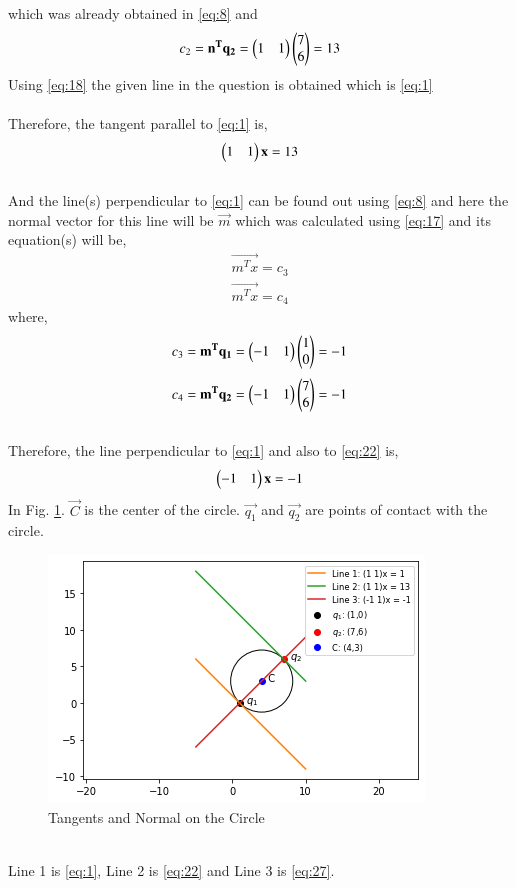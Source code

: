 \documentclass[journal,12pt,twocolumn]{IEEEtran}
\begin{document}
which was already obtained in \eqref{eq:8} and\\
\begin{align}
c_2 = \mathbf{n^Tq_2} = \begin{pmatrix}1 & 1\end{pmatrix}\begin{pmatrix}7 \\ 6\end{pmatrix} = 13 \label{eq:21}
\end{align}
Using \eqref{eq:18} the given line in the question is obtained which is \eqref{eq:1}\\\\
Therefore, the tangent parallel to \eqref{eq:1} is,
\begin{align}
\begin{pmatrix}1 & 1\end{pmatrix}\mathbf{x} = 13 \label{eq:22}
\end{align}\\
And the line(s) perpendicular to \eqref{eq:1} can be found out using \eqref{eq:8} and here the normal vector for this line will be $\vec{m}$ which was calculated using \eqref{eq:17} and its equation(s) will be,
\begin{align}
    \vec{m^Tx} = c_3 \label{eq:23}
\end{align}
\begin{align}
    \vec{m^Tx} = c_4 \label{eq:24}
\end{align}
where,
\begin{align}
c_3 = \mathbf{m^Tq_1} = \begin{pmatrix}-1 & 1\end{pmatrix}\begin{pmatrix}1 \\ 0\end{pmatrix} = -1 \label{eq:25}
\end{align}
\begin{align}
c_4 = \mathbf{m^Tq_2} =  \begin{pmatrix}-1 & 1\end{pmatrix}\begin{pmatrix}7 \\ 6\end{pmatrix} = -1  \label{eq:26}
\end{align}\\
Therefore, the line perpendicular to \eqref{eq:1} and also to \eqref{eq:22} is,
\begin{align}
 \begin{pmatrix}-1 & 1\end{pmatrix}\mathbf{x} = -1 \label{eq:27}   
\end{align}
\newpage
In Fig. \ref{Fig.1}. $\vec{C}$ is the center of the circle. $\vec{q_1}$ and $\vec{q_2}$ are points of contact with the circle. 
\begin{figure}[!ht]
    \includegraphics[scale = 0.75]{Figure.png}
    \caption{Tangents and Normal on the Circle}
    \label{Fig.1}
\end{figure}
\\
Line 1 is \eqref{eq:1}, Line 2 is \eqref{eq:22} and Line 3 is \eqref{eq:27}.
\end{document}
